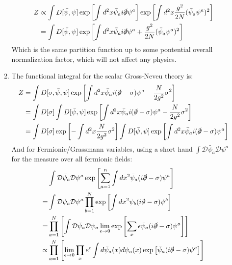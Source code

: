 \documentclass[12pt,a4]{article}
\begin{document}
\begin{enumerate}
\begin{enumerate}
\begin{align*}
          Z &\propto \int D[\bar{\psi}, \psi] \exp\left[\int d^2x \bar{\psi}_a i \slashed{\partial} \psi^a \right] \exp\left[\int d^2x \frac{g^2}{2N}(\bar{\psi}_a \psi^a)^2 \right]\\
            &= \int D[\bar{\psi}, \psi] \exp\left[\int d^2x \bar{\psi}_a i \slashed{\partial} \psi^a + \frac{g^2}{2N}(\bar{\psi}_a \psi^a)^2 \right]
        \end{align*}
        Which is the same partition function up to some pontential overall normalization factor, which will not affect any physics.
      \item
        The functional integral for the scalar Gross-Neveu theory is:
        \begin{align*}
          Z &= \int D[\sigma, \bar{\psi}, \psi] \exp\left[\int d^2x \bar{\psi}_a i (\slashed{\partial} - \sigma ) \psi^a - \frac{N}{2g^2} \sigma^2\right]\\
            &= \int D[\sigma] \int D[\bar{\psi}, \psi] \exp\left[\int d^2x \bar{\psi}_a i (\slashed{\partial} - \sigma ) \psi^a - \frac{N}{2g^2} \sigma^2\right]\\
            &= \int D[\sigma] \exp\left[- \int d^2x \frac{N}{2g^2} \sigma^2\right]\int D[\bar{\psi}, \psi] \exp\left[\int d^2x \bar{\psi}_a i (\slashed{\partial} - \sigma ) \psi^a \right]\\
        \end{align*}
        And for Fermionic/Grassmann variables, using a short hand $\int \mathcal{D} \bar{\psi}_a \mathcal{D} \psi^a$ for the measure over all fermionic fields:
        \begin{align*}
          &\int \mathcal{D} \bar{\psi}_a \mathcal{D} \psi^a \exp\left[\sum_{a = 1}^n\int dx^2 \bar{\psi}_a (i \slashed{\partial} - \sigma) \psi^a \right] \\
          =& \int \mathcal{D} \bar{\psi}_a \mathcal{D} \psi^a \prod_{b = 1}^N \exp\left[\int dx^2 \bar{\psi}_b (i \slashed{\partial} - \sigma) \psi^b \right]\\
                                                                                                                                             =& \prod_{a = 1}^N \left[\int \mathcal{D} \bar{\psi}_a \mathcal{D} \psi_a  \lim_{\epsilon \to 0}\exp\left[\sum_x \epsilon \bar{\psi}_a (i \slashed{\partial} - \sigma) \psi^a \right]\right]\\
                                                                                                                                       \propto      &  \prod_{a = 1}^N \left[\lim_{\epsilon \to 0}  \prod_x e^\epsilon \int d \bar{\psi}_a(x) d \psi_a(x)  \exp\left[\bar{\psi}_a (i \slashed{\partial} - \sigma) \psi^a \right]\right]\\

\end{align*}
\end{enumerate}
\end{enumerate}
\end{document}

